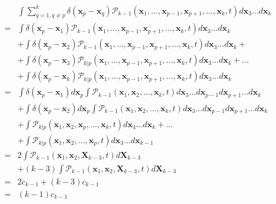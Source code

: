 \begin{subequations} 
\begin{flalign}
 & \int\sum_{q=1,q\neq p}^{k}\delta({\boldsymbol{x}_p-\boldsymbol{x}_q})\mathcal{P}_{k-1}(\boldsymbol{x}_{1},\ldots,\boldsymbol{x}_{p-1},\boldsymbol{x}_{p+1},\ldots,\boldsymbol{x}_{k},t)d\boldsymbol{x}_{3}\ldots d\boldsymbol{x}_{k}\\
= & \int\delta(\boldsymbol{x}_{p}-\boldsymbol{x}_{1})\mathcal{P}_{k-1}(\boldsymbol{x}_{1},\ldots,\boldsymbol{x}_{p-1},\boldsymbol{x}_{p+1},\ldots,\boldsymbol{x}_{k},t)d\boldsymbol{x}_{3}\ldots d\boldsymbol{x}_{k}\\
 & +\int\delta(\boldsymbol{x}_{p}-\boldsymbol{x}_{2})\mathcal{P}_{k-1}(\boldsymbol{x}_{1},\ldots,\boldsymbol{x}_{p-1},\boldsymbol{x}_{p+1},\ldots,\boldsymbol{x}_{k},t)d\boldsymbol{x}_{3}\ldots d\boldsymbol{x}_{k}+\\
 & + \int\delta({\boldsymbol{x}_p-\boldsymbol{x}_3})\mathcal{P}_{k|p}(\boldsymbol{x}_{1},\ldots,\boldsymbol{x}_{p-1},\boldsymbol{x}_{p+1},\ldots,\boldsymbol{x}_{k},t)d\boldsymbol{x}_{3}\ldots d\boldsymbol{x}_{k} + \ldots\\
 &+  \int\delta({\boldsymbol{x}_p-\boldsymbol{x}_k})\mathcal{P}_{k|p}(\boldsymbol{x}_{1},\ldots,\boldsymbol{x}_{p-1},\boldsymbol{x}_{p+1},\ldots,\boldsymbol{x}_{k},t)d\boldsymbol{x}_{3}\ldots d\boldsymbol{x}_{k}\\
= & \int\delta(\boldsymbol{x}_{p}-\boldsymbol{x}_{1})d\boldsymbol{x}_{p}\int\mathcal{P}_{k-1}(\boldsymbol{x}_{1},\boldsymbol{x}_{2},\ldots,\boldsymbol{x}_{k},t)d\boldsymbol{x}_{3}\ldots d\boldsymbol{x}_{p-1}d\boldsymbol{x}_{p+1}\ldots d\boldsymbol{x}_{k}\\
 & +\int\delta(\boldsymbol{x}_{p}-\boldsymbol{x}_{2})d\boldsymbol{x}_{p}\int\mathcal{P}_{k-1}(\boldsymbol{x}_{1},\boldsymbol{x}_{2},\ldots,\boldsymbol{x}_{k},t)d\boldsymbol{x}_{3}\ldots d\boldsymbol{x}_{p-1}d\boldsymbol{x}_{p+1}\ldots d\boldsymbol{x}_{k}\\
 & + \int\mathcal{P}_{k|p}(\boldsymbol{x}_{1},\boldsymbol{x}_{2},\boldsymbol{x}_{p},\ldots,\boldsymbol{x}_{k},t)d\boldsymbol{x}_{4}\ldots d\boldsymbol{x}_{k} + \ldots\\
 &+  \int\mathcal{P}_{k|p}(\boldsymbol{x}_{1},\boldsymbol{x}_{2},\ldots,\boldsymbol{x}_{p},t)d\boldsymbol{x}_{3}\ldots d\boldsymbol{x}_{k-1}\\
= & 2\int\mathcal{P}_{k-1}(\boldsymbol{x}_{1},\boldsymbol{x}_{2},\boldsymbol{X}_{k-3},t)d\boldsymbol{X}_{k-3}\\
 & +(k-3)\int\mathcal{P}_{k-1}(\boldsymbol{x}_{1},\boldsymbol{x}_{2},\boldsymbol{X}_{k-3},t)d\boldsymbol{X}_{k-3}\label{eq:birth_term_pgeq3_part2}\\
= & 2c_{k-1}+(k-3)c_{k-1}\\
= & (k-1)c_{k-1}
\end{flalign}
\end{subequations}


